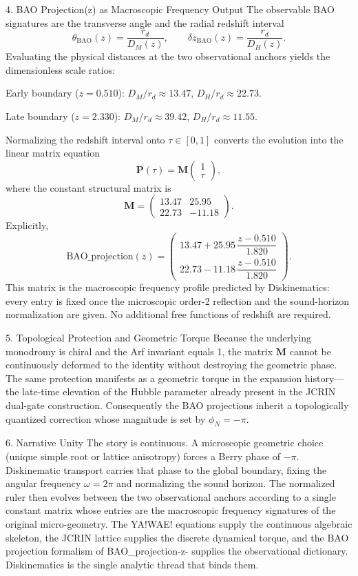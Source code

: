 4. BAO Projection(z) as Macroscopic Frequency Output
The observable BAO signatures are the transverse angle and the radial redshift interval  
\[
\theta_{\mathrm{BAO}}(z)=\frac{r_d}{D_M(z)},\qquad\delta z_{\mathrm{BAO}}(z)=\frac{r_d}{D_H(z)}.
\]  
Evaluating the physical distances at the two observational anchors yields the dimensionless scale ratios:

Early boundary (\(z=0.510\)):  
  \(D_M/r_d\approx13.47\), \(D_H/r_d\approx22.73\).

Late boundary (\(z=2.330\)):  
  \(D_M/r_d\approx39.42\), \(D_H/r_d\approx11.55\).

Normalizing the redshift interval onto \(\tau\in[0,1]\) converts the evolution into the linear matrix equation  
\[
\mathbf{P}(\tau)=\mathbf{M}\begin{pmatrix}1\\\tau\end{pmatrix},
\]  
where the constant structural matrix is  
\[
\mathbf{M}=\begin{pmatrix}13.47&25.95\\22.73&-11.18\end{pmatrix}.
\]  
Explicitly,  
\[
\mathrm{BAO\_projection}(z)=\begin{pmatrix}
13.47+25.95\,\dfrac{z-0.510}{1.820}\\
22.73-11.18\,\dfrac{z-0.510}{1.820}
\end{pmatrix}.
\]  
This matrix is the macroscopic frequency profile predicted by Diskinematics: every entry is fixed once the microscopic order-2 reflection and the sound-horizon normalization are given. No additional free functions of redshift are required.

5. Topological Protection and Geometric Torque
Because the underlying monodromy is chiral and the Arf invariant equals 1, the matrix \(\mathbf{M}\) cannot be continuously deformed to the identity without destroying the geometric phase. The same protection manifests as a geometric torque in the expansion history—the late-time elevation of the Hubble parameter already present in the JCRIN dual-gate construction. Consequently the BAO projections inherit a topologically quantized correction whose magnitude is set by \(\phi_N=-\pi\).

6. Narrative Unity
The story is continuous. A microscopic geometric choice (unique simple root or lattice anisotropy) forces a Berry phase of \(-\pi\). Diskinematic transport carries that phase to the global boundary, fixing the angular frequency \(\omega=2\pi\) and normalizing the sound horizon. The normalized ruler then evolves between the two observational anchors according to a single constant matrix whose entries are the macroscopic frequency signatures of the original micro-geometry. The YA!WAE! equations supply the continuous algebraic skeleton, the JCRIN lattice supplies the discrete dynamical torque, and the BAO projection formalism of BAO_projection-z- supplies the observational dictionary. Diskinematics is the single analytic thread that binds them.

